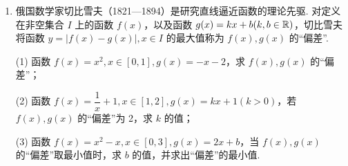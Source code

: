 \documentclass[a4paper,11pt]{article}
\begin{document}
\begin{enumerate}
\ifanswer
\solbegin
{}
\solend
\fi

\item 俄国数学家切比雪夫（1821—1894）是研究直线逼近函数的理论先驱. 对定义在非空集合 $I$ 上的函数 $f(x)$，以及函数 $g(x)=kx+b(k,b\in\mathbb{R})$，切比雪夫将函数 $y=\lvert f(x)-g(x)\rvert,x\in I$ 的最大值称为 $f(x),g(x)$ 的“偏差”.

(1) 函数 $f(x)=x^2,x\in[0,1],g(x)=-x-2$，求 $f(x),g(x)$ 的“偏差”；

(2) 函数 $f(x)=\dfrac1x+1,x\in[1,2],g(x)=kx+1(k>0)$，若 $f(x),g(x)$ 的“偏差”为 2，求 $k$ 的值；

(3) 函数 $f(x)=x^2-x,x\in[0,3],g(x)=2x+b$，当 $f(x),g(x)$ 的“偏差”取最小值时，求 $b$ 的值，并求出“偏差”的最小值.


\end{enumerate}
\end{document}
